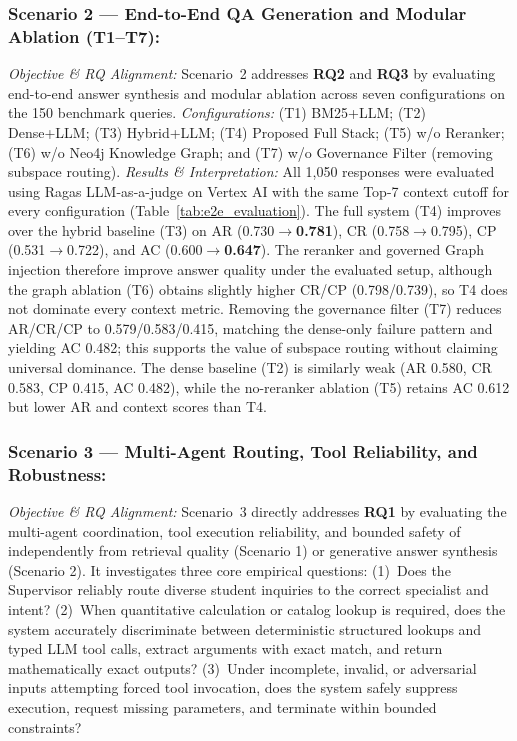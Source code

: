 \subsubsection{Scenario 2 --- End-to-End QA Generation and Modular Ablation (T1--T7):}
\emph{Objective \& RQ Alignment:} Scenario~2 addresses \textbf{RQ2} and \textbf{RQ3} by evaluating end-to-end answer synthesis and modular ablation across seven configurations on the 150 benchmark queries.
\emph{Configurations:} (T1) BM25+LLM; (T2) Dense+LLM; (T3) Hybrid+LLM; (T4) Proposed \system{} Full Stack; (T5) w/o Reranker; (T6) w/o Neo4j Knowledge Graph; and (T7) w/o Governance Filter (removing subspace routing).
\emph{Results \& Interpretation:} All 1,050 responses were evaluated using Ragas LLM-as-a-judge on Vertex AI with the same Top-7 context cutoff for every configuration (Table~\ref{tab:e2e_evaluation}). The full system (T4) improves over the hybrid baseline (T3) on AR (0.730$\rightarrow$\textbf{0.781}), CR (0.758$\rightarrow$0.795), CP (0.531$\rightarrow$0.722), and AC (0.600$\rightarrow$\textbf{0.647}). The reranker and governed Graph injection therefore improve answer quality under the evaluated setup, although the graph ablation (T6) obtains slightly higher CR/CP (0.798/0.739), so T4 does not dominate every context metric. Removing the governance filter (T7) reduces AR/CR/CP to 0.579/0.583/0.415, matching the dense-only failure pattern and yielding AC 0.482; this supports the value of subspace routing without claiming universal dominance. The dense baseline (T2) is similarly weak (AR 0.580, CR 0.583, CP 0.415, AC 0.482), while the no-reranker ablation (T5) retains AC 0.612 but lower AR and context scores than T4.

\subsubsection{Scenario 3 --- Multi-Agent Routing, Tool Reliability, and Robustness:}
\emph{Objective \& RQ Alignment:} Scenario~3 directly addresses \textbf{RQ1} by evaluating the multi-agent coordination, tool execution reliability, and bounded safety of \system{} independently from retrieval quality (Scenario 1) or generative answer synthesis (Scenario 2). It investigates three core empirical questions:
(1)~Does the Supervisor reliably route diverse student inquiries to the correct specialist and intent?
(2)~When quantitative calculation or catalog lookup is required, does the system accurately discriminate between deterministic structured lookups and typed LLM tool calls, extract arguments with exact match, and return mathematically exact outputs?
(3)~Under incomplete, invalid, or adversarial inputs attempting forced tool invocation, does the system safely suppress execution, request missing parameters, and terminate within bounded constraints?

